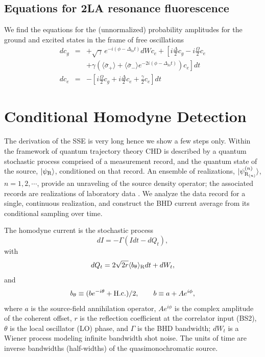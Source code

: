 \documentclass[twocolumn,aps,eqsecnum,showkeys,amsmath]{revtex4}
\providecommand{\vxp}[1]{\langle #1 \rangle}
\providecommand{\ket}[1]{\lvert #1 \rangle}
\begin{document}
\subsection{Equations for 2LA resonance fluorescence} 
We find the equations for the (unnormalized) probability amplitudes 
for the ground and excited states in the frame of free oscillations 
%
\begin{subequations}
\label{eq:GeneralSSEamp}
\begin{eqnarray}
dc_g &=& +\sqrt{\gamma} \, e^{-i(\phi-\Delta_{lo}t)} dW c_e 
	+\left[ i\frac{\Delta}{2} c_g -i\frac{\Omega}{2} c_e 	\right. 	
	\nonumber 	\\
&& \left. +\gamma \left( \vxp{\bar{\sigma}_+} 
	+\vxp{\bar{\sigma}_-} e^{-2i(\phi-\Delta_{lo}t)} \right) c_e \right] dt 	\\
%
dc_e &=& -\left[ i\frac{\Omega}{2} c_g 
 	+i\frac{\Delta}{2} c_e +\frac{\gamma}{2} c_e \right] dt
\end{eqnarray}
\end{subequations}


\section{Conditional Homodyne Detection}
The derivation of the SSE is very long hence we show a few steps only. Within the framework of quantum trajectory theory CHD is described by a quantum stochastic process comprised of a measurement record, and the quantum state of the source, 
$\ket{\psi_{\rm R}}$, conditioned on that record. An ensemble of realizations, 
$\ket{\psi_{{\rm R}_{(n)}}^{(n)} }$, $n=1,2,\cdots$, provide an unraveling of the 
source density operator; the associated records are realizations of laboratory data \cite{CCFO00,FOCC00}. We analyze the data record for a single, continuous 
realization, and construct the BHD current average from its conditional sampling 
over time.

The homodyne current is the stochastic process
%
\begin{equation} 	\label{eqn:current} 
dI = - \Gamma(Idt-dQ_t),
\end{equation}
with
%
\begin{equation}
dQ_t = 2 \sqrt{2r} \vxp{b_\theta}_{\rm R} dt +dW_t,
\end{equation}
and
%
\begin{equation}
 b_\theta \equiv ( b e^{-i\theta} +{\rm H.c.})/2, 	\qquad
	 b\equiv a+Ae^{i\phi},
\end{equation}
where $a$ is the source-field annihilation operator, $Ae^{i\phi}$ 
is the complex amplitude of the coherent offset, $r$ is the reflection
coefficient at the correlator input (BS2), $\theta$ is the local 
oscillator (LO) phase, and $\Gamma$ is the BHD bandwidth; $dW_t$ is a 
Wiener process modeling infinite bandwidth shot noise. The units of 
time are inverse bandwidths (half-widths) of the quasimonochromatic 
source.
\end{document}
